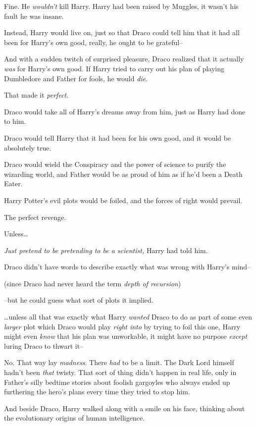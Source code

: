 Fine. He \emph{wouldn't} kill Harry. Harry had been raised by Muggles, it wasn't his fault he was insane.

Instead, Harry would live on, just so that Draco could tell him that it had all been for Harry's own good, really, he ought to be grateful\---

And with a sudden twitch of surprised pleasure, Draco realized that it actually \emph{was} for Harry's own good. If Harry tried to carry out his plan of playing Dumbledore and Father for fools, he would \emph{die}.

That made it \emph{perfect}.

Draco would take all of Harry's dreams away from him, just as Harry had done to him.

Draco would tell Harry that it had been for his own good, and it would be absolutely true.

Draco would wield the Conspiracy and the power of science to purify the wizarding world, and Father would be as proud of him as if he'd been a Death Eater.

Harry Potter's evil plots would be foiled, and the forces of right would prevail.

The perfect revenge.

Unless{\ldots}

\emph{Just pretend to be pretending to be a scientist,} Harry had told him.

Draco didn't have words to describe exactly what was wrong with Harry's mind\---

(since Draco had never heard the term \emph{depth of recursion})

\---but he could guess what sort of plots it implied.

{\ldots}unless all that was exactly what Harry \emph{wanted} Draco to do as part of some even \emph{larger} plot which Draco would play \emph{right into} by trying to foil this one, Harry might even \emph{know} that his plan was unworkable, it might have no purpose \emph{except} luring Draco to thwart it\---

No. That way lay \emph{madness}. There \emph{had} to be a limit. The Dark Lord himself hadn't been \emph{that} twisty. That sort of thing didn't happen in real life, only in Father's silly bedtime stories about foolish gargoyles who always ended up furthering the hero's plans every time they tried to stop him.

\later

And beside Draco, Harry walked along with a smile on his face, thinking about the evolutionary origins of human intelligence.


